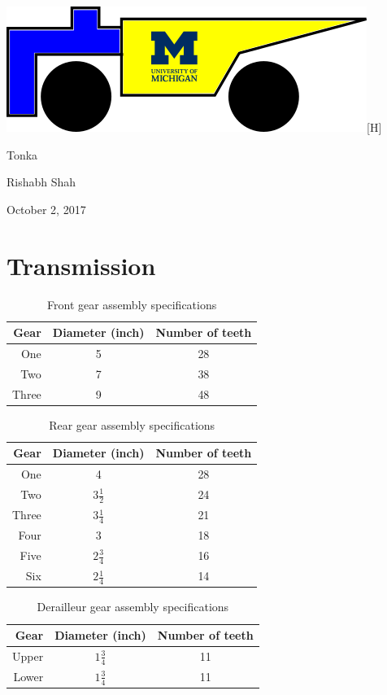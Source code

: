 \documentclass[11pt]{article}
\begin{document}
{\large\noindent \includegraphics{Logo}[H]

\noindent Tonka

\noindent Rishabh Shah

\noindent October 2, 2017}

\section*{Transmission}
\begin{table}[H]
	\centering
	\begin{tabular}{|r|c|c|}
		\hline
		\textbf{Gear} & \textbf{Diameter (inch)} & \textbf{Number of teeth} \\
		\hline
		One & 5 & 28 \\
		\hline
		Two & 7 & 38 \\
		\hline
		Three & 9 & 48 \\
		\hline
	\end{tabular}
	\caption{Front gear assembly specifications}
\end{table}
\begin{table}[H]
	\centering
	\begin{tabular}{|r|c|c|}
		\hline
		\textbf{Gear} & \textbf{Diameter (inch)} & \textbf{Number of teeth} \\
		\hline
		One & 4 & 28 \\
		\hline
		Two & \(3\frac{1}{2}\) & 24 \\
		\hline
		Three & \(3\frac{1}{4}\) & 21 \\
		\hline
		Four & 3 & 18 \\
		\hline
		Five & \(2\frac{3}{4}\) & 16 \\
		\hline
		Six & \(2\frac{1}{4}\) & 14 \\
		\hline
	\end{tabular}
	\caption{Rear gear assembly specifications}
\end{table}
\begin{table}[H]
	\centering
	\begin{tabular}{|r|c|c|}
		\hline
		\textbf{Gear} & \textbf{Diameter (inch)} & \textbf{Number of teeth} \\
		\hline
		Upper & \(1\frac{3}{4}\) & 11 \\
		\hline
		Lower & \(1\frac{3}{4}\) & 11 \\
		\hline
	\end{tabular}
	\caption{Derailleur gear assembly specifications}
\end{table}
\end{document}
